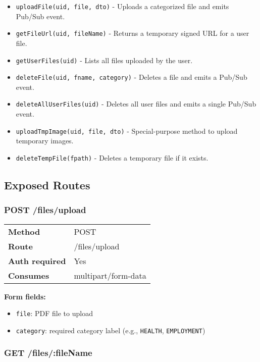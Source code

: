\begin{itemize}
    \item \texttt{uploadFile(uid, file, dto)} - Uploads a categorized file and emits Pub/Sub event.
    \item \texttt{getFileUrl(uid, fileName)} - Returns a temporary signed URL for a user file.
    \item \texttt{getUserFiles(uid)} - Lists all files uploaded by the user.
    \item \texttt{deleteFile(uid, fname, category)} - Deletes a file and emits a Pub/Sub event.
    \item \texttt{deleteAllUserFiles(uid)} - Deletes all user files and emits a single Pub/Sub event.
    \item \texttt{uploadTmpImage(uid, file, dto)} - Special-purpose method to upload temporary images.
    \item \texttt{deleteTempFile(fpath)} - Deletes a temporary file if it exists.
\end{itemize}

\subsection*{Exposed Routes}

\subsubsection*{POST /files/upload}

\begin{tabular}{>{\bfseries}l l}
\toprule
Method & POST \\
Route & /files/upload \\
Auth required & Yes \\
Consumes & multipart/form-data \\
\bottomrule
\end{tabular}

\vspace{1em}
\textbf{Form fields:}
\begin{itemize}
    \item \texttt{file}: PDF file to upload
    \item \texttt{category}: required category label (e.g., \texttt{HEALTH}, \texttt{EMPLOYMENT})
\end{itemize}

\subsubsection*{GET /files/:fileName}


